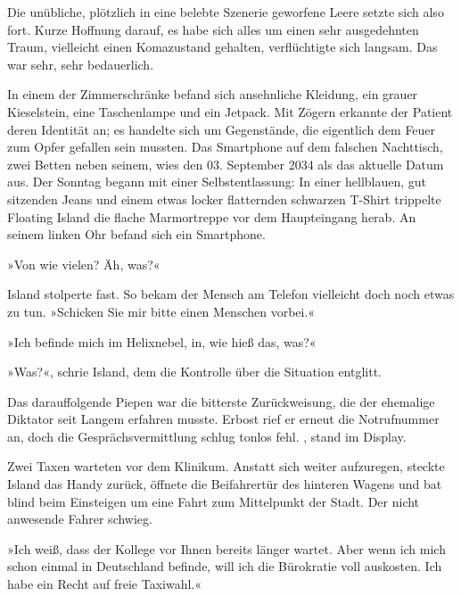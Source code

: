 Die unübliche, plötzlich in eine belebte Szenerie geworfene Leere setzte sich also fort. Kurze Hoffnung darauf, es habe sich alles um einen sehr ausgedehnten Traum, vielleicht einen Komazustand gehalten, verflüchtigte sich langsam. Das war sehr, sehr bedauerlich.

In einem der Zimmerschränke befand sich ansehnliche Kleidung, ein grauer Kieselstein, eine Taschenlampe und ein Jetpack. Mit Zögern erkannte der Patient deren Identität an; es handelte sich um Gegenstände, die eigentlich dem Feuer zum Opfer gefallen sein mussten. Das Smartphone auf dem falschen Nachttisch, zwei Betten neben seinem, wies den 03. September 2034 als das aktuelle Datum aus. Der Sonntag begann mit einer Selbstentlassung: In einer hellblauen, gut sitzenden Jeans und einem etwas locker flatternden schwarzen T-Shirt trippelte Floating Island die flache Marmortreppe vor dem Haupteingang herab. An seinem linken Ohr befand sich ein Smartphone.


»Von wie vielen? Äh, was?«


Island stolperte fast. So bekam der Mensch am Telefon vielleicht doch noch etwas zu tun. »Schicken Sie mir bitte einen Menschen vorbei.«


»Ich befinde mich im Helixnebel, in, wie hieß das, was?«


»Was?«, schrie Island, dem die Kontrolle über die Situation entglitt.

 Das darauffolgende Piepen war die bitterste Zurückweisung, die der ehemalige Diktator seit Langem erfahren musste. Erbost rief er erneut die Notrufnummer an, doch die Gesprächsvermittlung schlug tonlos fehl. , stand im Display.

Zwei Taxen warteten vor dem Klinikum. Anstatt sich weiter aufzuregen, steckte Island das Handy zurück, öffnete die Beifahrertür des hinteren Wagens und bat blind beim Einsteigen um eine Fahrt zum Mittelpunkt der Stadt. Der nicht anwesende Fahrer schwieg.

»Ich weiß, dass der Kollege vor Ihnen bereits länger wartet. Aber wenn ich mich schon einmal in Deutschland befinde, will ich die Bürokratie voll auskosten. Ich habe ein Recht auf freie Taxiwahl.«

